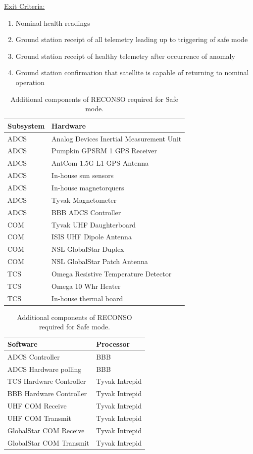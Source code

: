 \documentclass{article}
\begin{document}
\underline{Exit Criteria:}

\begin{enumerate}
\item Nominal health readings 
\item Ground station receipt of all telemetry leading up to triggering of safe mode
\item Ground station receipt of healthy telemetry after occurrence of anomaly
\item Ground station confirmation that satellite is capable of returning to nominal operation
\end{enumerate}

\begin{table}[h!]
\caption{Additional components of RECONSO required for Safe mode.}
\begin{adjustbox}{center}
\begin{tabular}{|l|l|}
\hline
Subsystem & Hardware \\ \hline \hline
ADCS & Analog Devices Inertial Measurement Unit  \\ \hline
ADCS & Pumpkin GPSRM 1 GPS Receiver \\ \hline
ADCS & AntCom 1.5G L1 GPS Antenna  \\ \hline
ADCS & In-house sun sensors  \\ \hline
ADCS & In-house magnetorquers  \\ \hline
ADCS & Tyvak Magnetometer \\ \hline
ADCS & BBB ADCS Controller \\ \hline \hline
COM & Tyvak UHF Daughterboard  \\ \hline
COM & ISIS UHF Dipole Antenna  \\ \hline
COM & NSL GlobalStar Duplex  \\ \hline
COM & NSL GlobalStar Patch Antenna \\ \hline \hline
TCS & Omega Resistive Temperature Detector \\ \hline
TCS & Omega 10 Whr Heater  \\ \hline
TCS & In-house thermal board \\ \hline
\end{tabular}

\quad

\begin{tabular}{|l|l|}
\hline
Software & Processor \\ \hline \hline
ADCS Controller & BBB \\ \hline
ADCS Hardware polling & BBB \\ \hline \hline
TCS Hardware Controller & Tyvak Intrepid \\ \hline
BBB Hardware Controller & Tyvak Intrepid \\ \hline
UHF COM Receive & Tyvak Intrepid \\ \hline
UHF COM Transmit & Tyvak Intrepid \\ \hline
GlobalStar COM Receive & Tyvak Intrepid \\ \hline
GlobalStar COM Transmit & Tyvak Intrepid \\ \hline
\end{tabular}
\end{adjustbox}
\end{table}
\end{document}
